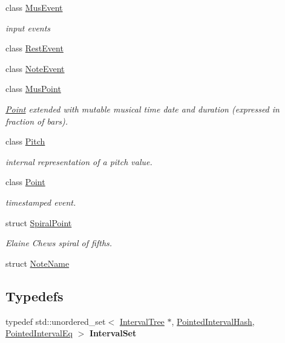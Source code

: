\begin{DoxyCompactItemize}
class \mbox{\hyperlink{classMusEvent}{Mus\+Event}}
\begin{DoxyCompactList}\small\item\em input events \end{DoxyCompactList}\item 
class \mbox{\hyperlink{classRestEvent}{Rest\+Event}}
\item 
class \mbox{\hyperlink{classNoteEvent}{Note\+Event}}
\item 
class \mbox{\hyperlink{classMusPoint}{Mus\+Point}}
\begin{DoxyCompactList}\small\item\em \mbox{\hyperlink{classPoint}{Point}} extended with mutable musical time date and duration (expressed in fraction of bars). \end{DoxyCompactList}\item 
class \mbox{\hyperlink{classPitch}{Pitch}}
\begin{DoxyCompactList}\small\item\em internal representation of a pitch value. \end{DoxyCompactList}\item 
class \mbox{\hyperlink{classPoint}{Point}}
\begin{DoxyCompactList}\small\item\em timestamped event. \end{DoxyCompactList}\item 
struct \mbox{\hyperlink{structSpiralPoint}{Spiral\+Point}}
\begin{DoxyCompactList}\small\item\em Elaine Chew\textquotesingle{}s spiral of fifths. \end{DoxyCompactList}\item 
struct \mbox{\hyperlink{structNoteName}{Note\+Name}}
\end{DoxyCompactItemize}
\subsection*{Typedefs}
\begin{DoxyCompactItemize}
\item 
\mbox{\label{group__segment_ga8156ae2f00d13429f64689ba96dca4cc}} 
typedef std\+::unordered\+\_\+set$<$ \mbox{\hyperlink{classIntervalTree}{Interval\+Tree}} $\ast$, \mbox{\hyperlink{structPointedIntervalHash}{Pointed\+Interval\+Hash}}, \mbox{\hyperlink{structPointedIntervalEq}{Pointed\+Interval\+Eq}} $>$ {\bfseries Interval\+Set}
\end{DoxyCompactItemize}

